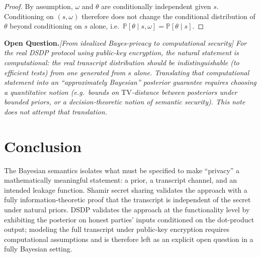 \documentclass[11pt,a4paper]{article}
\theoremstyle{definition}
\theoremstyle{remark}
\newenvironment{openquestion}{\par\textbf{Open Question.}\itshape}{\par}
\newcommand{\Prb}{\mathbb{P}}
\newcommand{\TV}{\mathrm{TV}}
\begin{document}
\begin{proof}
By assumption, \(\omega\) and \(\theta\) are conditionally independent given \(s\). Conditioning on \((s,\omega)\) therefore does not change the conditional distribution of \(\theta\) beyond conditioning on \(s\) alone, i.e.\ \(\Prb[\theta\mid s,\omega]=\Prb[\theta\mid s]\).
\end{proof}

\begin{openquestion}[From idealized Bayes-privacy to computational security]
For the real DSDP protocol using public-key encryption, the natural statement is computational: the real transcript distribution should be indistinguishable (to efficient tests) from one generated from \(s\) alone. Translating that computational statement into an ``approximately Bayesian'' posterior guarantee requires choosing a quantitative notion (e.g.\ bounds on \(\TV\)-distance between posteriors under bounded priors, or a decision-theoretic notion of semantic security). This note does not attempt that translation.
\end{openquestion}

\section{Conclusion}
\label{sec:conclusion}

The Bayesian semantics isolates what must be specified to make ``privacy'' a mathematically meaningful statement: a prior, a transcript channel, and an intended leakage function. Shamir secret sharing validates the approach with a fully information-theoretic proof that the transcript is independent of the secret under natural priors. DSDP validates the approach at the functionality level by exhibiting the posterior on honest parties' inputs conditioned on the dot-product output; modeling the full transcript under public-key encryption requires computational assumptions and is therefore left as an explicit open question in a fully Bayesian setting.



\end{document}
